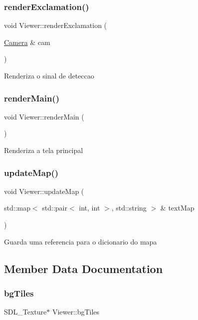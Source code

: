 \subsubsection{\texorpdfstring{render\+Exclamation()}{renderExclamation()}}
{\footnotesize\ttfamily void Viewer\+::render\+Exclamation (\begin{DoxyParamCaption}\item[{\hyperlink{classCamera}{Camera} \&}]{cam }\end{DoxyParamCaption})}

Renderiza o sinal de deteccao \mbox{\label{classViewer_a2f6616a8c04e79b4251c7d1aaf1d3aaa}} 
\subsubsection{\texorpdfstring{render\+Main()}{renderMain()}}
{\footnotesize\ttfamily void Viewer\+::render\+Main (\begin{DoxyParamCaption}{ }\end{DoxyParamCaption})}

Renderiza a tela principal \mbox{\label{classViewer_ab9787f02682d9e2b699ab16cd20fe43a}} 
\subsubsection{\texorpdfstring{update\+Map()}{updateMap()}}
{\footnotesize\ttfamily void Viewer\+::update\+Map (\begin{DoxyParamCaption}\item[{std\+::map$<$ std\+::pair$<$ int, int $>$, std\+::string $>$ \&}]{text\+Map }\end{DoxyParamCaption})}

Guarda uma referencia para o dicionario do mapa 

\subsection{Member Data Documentation}
\mbox{\label{classViewer_a05710c1f079a9099419fd1882643a349}} 
\subsubsection{\texorpdfstring{bg\+Tiles}{bgTiles}}
{\footnotesize\ttfamily S\+D\+L\+\_\+\+Texture$\ast$ Viewer\+::bg\+Tiles}


